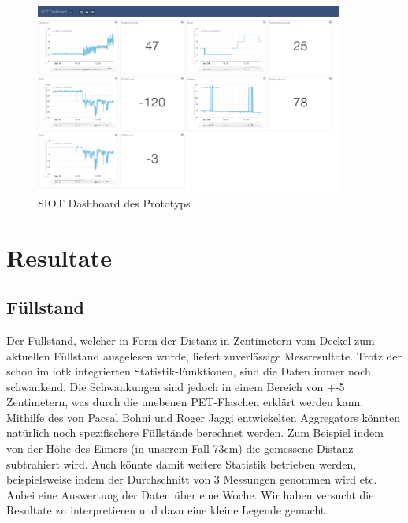 \begin{figure}[H]
     \centering
        \includegraphics[width=0.9\textwidth]{pictures/SIOT.png}
    \caption{SIOT Dashboard des Prototyps}
    \label{fig:SIOT-Dashboard}
\end{figure}


\section{Resultate}
\subsection*{Füllstand}
Der Füllstand, welcher in Form der Distanz in Zentimetern vom Deckel zum aktuellen Füllstand ausgelesen wurde, liefert zuverlässige Messresultate. 
Trotz der schon im \gls{iotk} integrierten Statistik-Funktionen, sind die Daten immer noch schwankend. Die Schwankungen sind jedoch in einem Bereich von +-5 Zentimetern, was durch die unebenen PET-Flaschen erklärt werden kann.
Mithilfe des von Pacsal Bohni und Roger Jaggi entwickelten Aggregators könnten natürlich noch spezifischere Füllstände berechnet werden. Zum Beispiel indem von der Höhe des Eimers (in unserem Fall 73cm) die gemessene Distanz subtrahiert wird. Auch könnte damit weitere Statistik betrieben werden, beispielsweise indem der Durchschnitt von 3 Messungen genommen wird etc.
Anbei eine Auswertung der Daten über eine Woche. Wir haben versucht die Resultate zu interpretieren und dazu eine kleine Legende gemacht.


